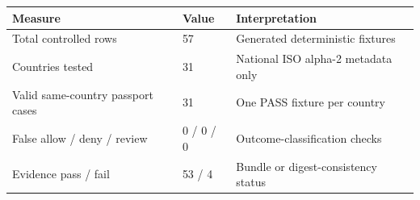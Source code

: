 \begin{tabularx}{\linewidth}{@{}XXX@{}}
\toprule
Measure & Value & Interpretation \\
\midrule
Total controlled rows & 57 & Generated deterministic fixtures \\
Countries tested & 31 & National ISO alpha-2 metadata only \\
Valid same-country passport cases & 31 & One PASS fixture per country \\
False allow / deny / review & 0 / 0 / 0 & Outcome-classification checks \\
Evidence pass / fail & 53 / 4 & Bundle or digest-consistency status \\
\bottomrule
\end{tabularx}
